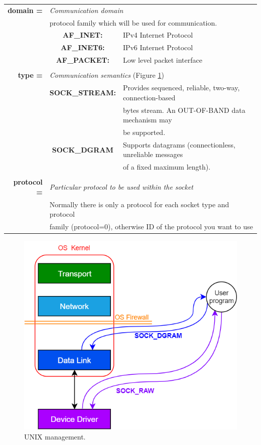 \begin{table}[h]
\centering
\begin{tabular}{rcl}
\textbf{domain =} & \multicolumn{2}{l}{\textit{Communication domain}}\\
{} & \multicolumn{2}{l}{protocol family which will be used for communication.}\\
{} & \textbf{AF\_INET:} & {IPv4 Internet Protocol}\\
{} & \textbf{AF\_INET6:} & {IPv6 Internet Protocol}\\
{} & \textbf{AF\_PACKET:} & {Low level packet interface}\\
& &\\
\textbf{type =} & \multicolumn{2}{l}{\textit{Communication semantics} (Figure \ref{unix_low})}\\
{} & \textbf{SOCK\_STREAM:} & {Provides sequenced, reliable, two-way, connection-based}\\
{} & {} & {bytes stream. An OUT-OF-BAND data mechanism may}\\
{} & {} & {be supported.}\\
{} & \textbf{SOCK\_DGRAM} & {Supports datagrams (connectionless, unreliable messages} \\
& & {of a fixed maximum length).}\\
& & \\
\textbf{protocol =} & \multicolumn{2}{l}{\textit{Particular protocol to be used within the socket}}\\
{} & \multicolumn{2}{l}{Normally there is only a protocol for each socket type and protocol}\\
{} & \multicolumn{2}{l}{family (protocol=0), otherwise ID of the protocol you want to use}\\
\end{tabular}
\end{table}
\begin{figure}[H]
\centering
\includegraphics[scale=0.45]{Images/NetworkC/unix_low}
\caption{\footnotesize{UNIX management.}}\label{unix_low}
\end{figure}

